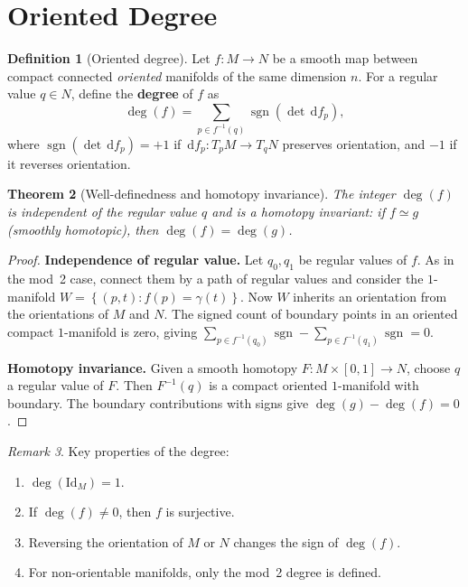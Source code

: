 \documentclass[12pt,a4paper,openany]{book}
\newtheorem{theorem}{Theorem}[section]
\theoremstyle{definition}
\newtheorem{definition}[theorem]{Definition}
\theoremstyle{remark}
\newtheorem{remark}[theorem]{Remark}
\newcommand{\Id}{\mathrm{Id}}
\newcommand{\dd}{\,\mathrm{d}}
\newcommand{\set}[1]{\left\{ #1 \right\}}
\begin{document}
\section{Oriented Degree}\label{sec:oriented-degree}

\begin{definition}[Oriented degree]\label{def:oriented-degree}
Let $f\colon M \to N$ be a smooth map between compact connected
\emph{oriented} manifolds of the same dimension $n$. For a regular value
$q \in N$, define the \textbf{degree} of $f$ as
\[
  \deg(f) = \sum_{p \in f^{-1}(q)} \operatorname{sgn}(\det \dd f_p),
\]
where $\operatorname{sgn}(\det \dd f_p) = +1$ if $\dd f_p\colon T_pM \to T_qN$
preserves orientation, and $-1$ if it reverses orientation.
\end{definition}

\begin{theorem}[Well-definedness and homotopy invariance]\label{thm:degree-welldefined}
The integer $\deg(f)$ is independent of the regular value $q$ and is
a homotopy invariant: if $f \simeq g$ (smoothly homotopic), then
$\deg(f) = \deg(g)$.
\end{theorem}

\begin{proof}
\textbf{Independence of regular value.}
Let $q_0, q_1$ be regular values of $f$. As in the mod~2 case, connect
them by a path of regular values and consider the $1$-manifold
$W = \set{(p,t): f(p) = \gamma(t)}$. Now $W$ inherits an orientation
from the orientations of $M$ and $N$. The signed count of boundary
points in an oriented compact $1$-manifold is zero, giving
$\sum_{p\in f^{-1}(q_0)}\operatorname{sgn} - \sum_{p\in f^{-1}(q_1)}\operatorname{sgn} = 0$.

\textbf{Homotopy invariance.}
Given a smooth homotopy $F\colon M\times[0,1]\to N$, choose $q$ a
regular value of $F$. Then $F^{-1}(q)$ is a compact oriented
$1$-manifold with boundary. The boundary contributions with signs
give $\deg(g)-\deg(f) = 0$.
\end{proof}

\begin{remark}\label{rem:degree-properties}
Key properties of the degree:
\begin{enumerate}[label=(\alph*)]
  \item $\deg(\Id_M) = 1$.
  \item If $\deg(f) \neq 0$, then $f$ is surjective.
  \item Reversing the orientation of $M$ or $N$ changes the sign of $\deg(f)$.
  \item For non-orientable manifolds, only the mod~2 degree is defined.
\end{enumerate}
\end{remark}
\end{document}
